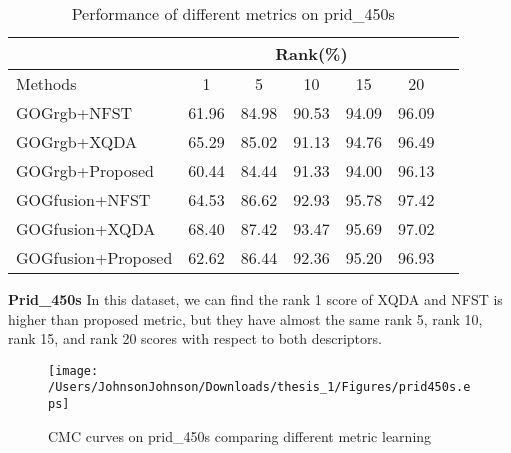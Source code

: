 \begin{table}[H]
\caption{Performance of different metrics on prid\_450s}
\centering
\begin{tabular}{|l|c|c|c|c|c|c|}
\hline
& \multicolumn{5}{|c|}{Rank(\%)} \\
\hline
Methods& 1 & 5 &10& 15&20\\
\hline
GOGrgb+NFST& 61.96&84.98 &90.53& 94.09&96.09 \\  %
\hline
GOGrgb+XQDA&65.29 &85.02 & 91.13&94.76& 96.49\\ 
\hline
GOGrgb+Proposed&60.44& 84.44&91.33&94.00&96.13\\  %
\hline
GOGfusion+NFST& 64.53&86.62 & 92.93&95.78&97.42 \\ 
\hline
GOGfusion+XQDA&68.40 & 87.42&93.47 &95.69& 97.02\\ 
\hline
GOGfusion+Proposed&62.62&86.44&92.36&95.20& 96.93\\ %

\hline

\end{tabular}
\end{table}
\textbf{Prid\_450s} In this dataset, we can find the rank 1 score of XQDA and NFST is higher than proposed metric, but they have almost the same rank 5, rank 10, rank 15, and rank 20 scores with respect to both descriptors. 

\begin{figure}[H]
\begin{raggedleft}
\texttt{[image: /Users/JohnsonJohnson/Downloads/thesis\_1/Figures/prid450s.eps]}
\vspace{-3em}
\caption{CMC curves on prid\_450s comparing different metric learning}
\end{raggedleft}
\end{figure}

